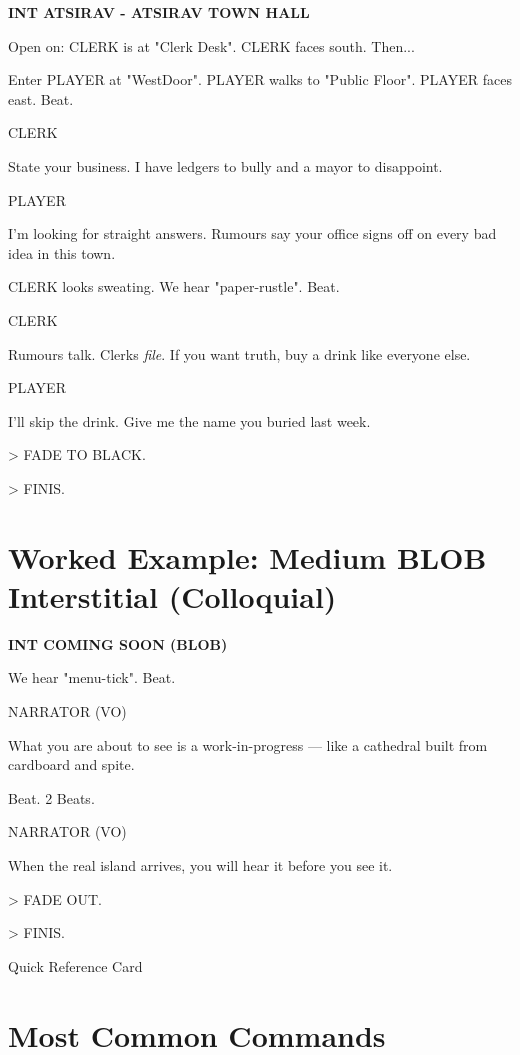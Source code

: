 \documentclass[11pt,letterpaper,oldstylefigures]{memoir}
\makeatletter
\newcommand{\slugline}[1]{\nobreak\textbf{\MakeUppercase{#1}}\par\nobreak\vspace{1\baselineskip}}
\newcommand{\speaker}[1]{\nobreak\hspace*{0.333\textwidth}\MakeUppercase{#1}\par\nobreak\vspace{0.5\baselineskip}}
\newcommand{\dialogue}[1]{\nobreak\hspace*{0.25\textwidth}\begin{minipage}{0.5\textwidth}#1\end{minipage}\par\vspace{1\baselineskip}}
\newcommand{\stagedir}[1]{#1\par\vspace{1\baselineskip}}
\newenvironment{FountainExample}
  {\begingroup
  \ttfamily\small
   \setlength{\parindent}{0pt}
  \setlength{\parskip}{0.5em}
  \allowdisplaybreaks
  \setlength{\displaywidowpenalty}{0}
  \setlength{\widowpenalty}{0}
  \setlength{\clubpenalty}{0}
  \setlength{\interlinepenalty}{0}
}
  {\endgroup}
\newcommand{\sceneendcmd}[1]{\begin{flushright}\ttfamily #1\end{flushright}}
\let\oldchapter\chapter
\def\chapter{%
  \@ifstar
    {\FountainScripting@starchapter}%
    {\@dblarg\FountainScripting@chapter}}
\def\FountainScripting@starchapter#1{\oldchapter*{#1}\chaptermark{#1}}
\def\FountainScripting@chapter[#1]#2{\oldchapter[#1]{#2}\chaptermark{#2}}
\makeatother
\begin{document}
\begin{FountainExample}
\slugline{INT ATSIRAV - ATSIRAV TOWN HALL}

\stagedir{Open on: CLERK is at "Clerk Desk". CLERK faces south. Then...}
\stagedir{Enter PLAYER at "WestDoor". PLAYER walks to "Public Floor". PLAYER faces east. Beat.}

\speaker{CLERK}
\dialogue{State your business. I have ledgers to bully and a mayor to disappoint.}

\speaker{PLAYER}
\dialogue{I'm looking for straight answers. Rumours say your office signs off on every bad idea in this town.}

\stagedir{CLERK looks sweating. We hear "paper-rustle". Beat.}

\speaker{CLERK}
\dialogue{Rumours talk. Clerks \emph{file}. If you want truth, buy a drink like everyone else.}

\speaker{PLAYER}
\dialogue{I'll skip the drink. Give me the name you buried last week.}

\sceneendcmd{> FADE TO BLACK.}
\sceneendcmd{> FINIS.}
\end{FountainExample}

\section{Worked Example: Medium BLOB Interstitial (Colloquial)}

\begin{FountainExample}
\slugline{INT COMING SOON (BLOB)}

\stagedir{We hear "menu-tick". Beat.}

\speaker{NARRATOR (VO)}
\dialogue{What you are about to see is a work-in-progress --- like a cathedral built from cardboard and spite.}

\stagedir{Beat. 2 Beats.}

\speaker{NARRATOR (VO)}
\dialogue{When the real island arrives, you will hear it before you see it.}

\sceneendcmd{> FADE OUT.}
\sceneendcmd{> FINIS.}
\end{FountainExample}

\chapter{Quick Reference Card}
\label{app:quick-reference}

\section{Most Common Commands}
\end{document}

